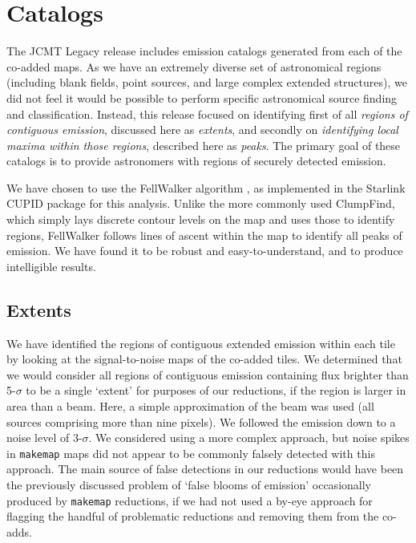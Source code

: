 \documentclass[twocolumn,times]{aastex6}
\begin{document}
\section{Catalogs}
\label{sec:cat}
The JCMT Legacy release includes emission catalogs generated from
each of the co-added maps. As we have an extremely diverse set of
astronomical regions (including blank fields, point sources, and large
complex extended structures), we did not feel it would be possible to
perform specific astronomical source finding and
classification. Instead, this release focused on identifying first of
all \emph{regions of contiguous emission}, discussed here as
\emph{extents}, and secondly on \emph{identifying local maxima within
those regions}, described here as \emph{peaks}. The primary goal of
these catalogs is to provide astronomers with regions of securely
detected emission.


We have chosen to use the FellWalker algorithm \citep{Berry2015}, as
implemented in the Starlink CUPID \citep{cupid} package for this
analysis. Unlike the more commonly used ClumpFind, which simply lays
discrete contour levels on the map and uses those to identify regions,
FellWalker follows lines of ascent within the map to identify all
peaks of emission. We have found it to be robust and
easy-to-understand, and to produce intelligible results.

\subsection{Extents}
\label{sec:extents}
We have identified the regions of contiguous extended emission within
each tile by looking at the signal-to-noise maps of the co-added
tiles. We determined that we would consider all regions of contiguous
emission containing flux brighter than 5-$\sigma$ to be a single `extent'
for purposes of our reductions, if the region is larger in area than a
beam.  Here, a simple approximation of the beam was used (all sources
comprising more than nine pixels). We followed the emission down to a noise level
of 3-$\sigma$. We considered using a more complex approach, but noise
spikes in \texttt{makemap} maps did not appear to be commonly falsely detected
with this approach. The main source of false detections in our
reductions would have been the previously discussed problem of `false
blooms of emission' occasionally produced by \texttt{makemap} reductions, if we
had not used a by-eye approach for flagging the handful of problematic
reductions and removing them from the co-adds.
\end{document}
